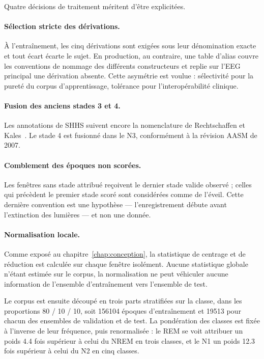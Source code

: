 Quatre décisions de traitement méritent d'être explicitées.

\paragraph{Sélection stricte des dérivations.} À l'entraînement, les cinq dérivations
sont exigées sous leur dénomination exacte et tout écart écarte le sujet. En
production, au contraire, une table d'alias couvre les conventions de nommage des
différents constructeurs et replie sur l'EEG principal une dérivation absente. Cette
asymétrie est voulue : sélectivité pour la pureté du corpus d'apprentissage,
tolérance pour l'interopérabilité clinique.

\paragraph{Fusion des anciens stades 3 et 4.} Les annotations de SHHS suivent encore
la nomenclature de Rechtschaffen et Kales~\cite{rechtschaffen1968}. Le stade 4 est
fusionné dans le N3, conformément à la révision AASM de 2007.

\paragraph{Comblement des époques non scorées.} Les fenêtres sans stade attribué
reçoivent le dernier stade valide observé ; celles qui précèdent le premier stade
scoré sont considérées comme de l'éveil. Cette dernière convention est une hypothèse —
l'enregistrement débute avant l'extinction des lumières — et non une donnée.

\paragraph{Normalisation locale.} Comme exposé au chapitre~\ref{chap:conception}, la
statistique de centrage et de réduction est calculée sur chaque fenêtre isolément.
Aucune statistique globale n'étant estimée sur le corpus, la normalisation ne peut
véhiculer aucune information de l'ensemble d'entraînement vers l'ensemble de test.

Le corpus est ensuite découpé en trois parts stratifiées sur la classe, dans les
proportions \num{80} / \num{10} / \num{10}, soit \num{156104} époques d'entraînement
et \num{19513} pour chacun des ensembles de validation et de test. La pondération des
classes est fixée à l'inverse de leur fréquence, puis renormalisée : le REM se voit
attribuer un poids \num{4,4} fois supérieur à celui du NREM en trois classes, et le N1
un poids \num{12,3} fois supérieur à celui du N2 en cinq classes.

